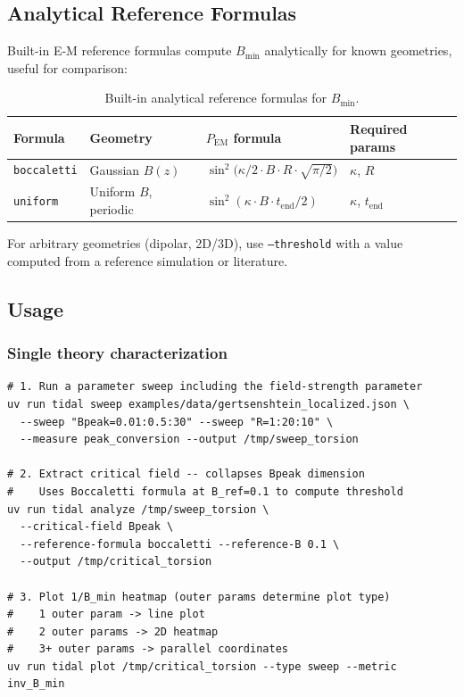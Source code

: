 \subsection{Analytical Reference Formulas}
\label{sec:cf-reference}

Built-in E-M reference formulas compute $B_\text{min}$ analytically for known
geometries, useful for comparison:

\begin{table}[htbp]
\centering
\caption{Built-in analytical reference formulas for $B_\text{min}$.}
\label{tab:reference-formulas}
\begin{tabular}{@{}llll@{}}
\toprule
Formula & Geometry & $P_\text{EM}$ formula & Required params \\
\midrule
\texttt{boccaletti} & Gaussian $B(z)$ & $\sin^2\!\bigl(\kappa/2 \cdot B \cdot R \cdot \sqrt{\pi/2}\bigr)$ & $\kappa$, $R$ \\
\texttt{uniform}    & Uniform $B$, periodic & $\sin^2(\kappa \cdot B \cdot t_\text{end} / 2)$                   & $\kappa$, $t_\text{end}$ \\
\bottomrule
\end{tabular}
\end{table}

For arbitrary geometries (dipolar, 2D/3D), use \texttt{--threshold} with a value
computed from a reference simulation or literature.

\subsection{Usage}
\label{sec:cf-usage}

\subsubsection{Single theory characterization}
\label{sec:single-theory}

\begin{lstlisting}[style=bash]
# 1. Run a parameter sweep including the field-strength parameter
uv run tidal sweep examples/data/gertsenshtein_localized.json \
  --sweep "Bpeak=0.01:0.5:30" --sweep "R=1:20:10" \
  --measure peak_conversion --output /tmp/sweep_torsion

# 2. Extract critical field -- collapses Bpeak dimension
#    Uses Boccaletti formula at B_ref=0.1 to compute threshold
uv run tidal analyze /tmp/sweep_torsion \
  --critical-field Bpeak \
  --reference-formula boccaletti --reference-B 0.1 \
  --output /tmp/critical_torsion

# 3. Plot 1/B_min heatmap (outer params determine plot type)
#    1 outer param -> line plot
#    2 outer params -> 2D heatmap
#    3+ outer params -> parallel coordinates
uv run tidal plot /tmp/critical_torsion --type sweep --metric inv_B_min
\end{lstlisting}

